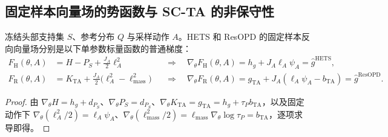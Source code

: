 \documentclass[lang=cn,scheme=chinese,openany]{elegantbook}
\begin{document}
\subsection{固定样本向量场的势函数与 SC-TA 的非保守性}

\begin{proposition}
\label{est:sample-potentials}
冻结头部支持集 $S$、参考分布 $Q$ 与采样动作 $A$。HETS 和 ResOPD 的固定样本反向向量场分别是以下单参数标量函数的普通梯度：
\begin{align}
F_{\mathrm H}(\theta,A)&=H-P_S+\frac{J_A}{2}\ell_A^2
&&\Longrightarrow\quad \nabla_\theta F_{\mathrm H}(\theta,A)=h_g+J_A\ell_A\psi_A=\widehat g^{\mathrm{HETS}},\\
F_{\mathrm R}(\theta,A)&=K_{\mathrm{TA}}+\frac{J_A}{2}\bigl(\ell_A^2-\ell_{\mathrm{mass}}^2\bigr)
&&\Longrightarrow\quad \nabla_\theta F_{\mathrm R}(\theta,A)=g_{\mathrm{TA}}+J_A(\ell_A\psi_A-b_{\mathrm{TA}})=\widehat g^{\mathrm{ResOPD}}.
\end{align}
\end{proposition}
\begin{proof}
由 $\nabla_\theta H=h_g+d_{P_S}$、$\nabla_\theta P_S=d_{P_S}$、$\nabla_\theta K_{\mathrm{TA}}=g_{\mathrm{TA}}=h_g+\tau_P b_{\mathrm{TA}}$，以及固定动作下 $\nabla_\theta(\ell_A^2/2)=\ell_A\psi_A$、$\nabla_\theta(\ell_{\mathrm{mass}}^2/2)=\ell_{\mathrm{mass}}\nabla_\theta\log\tau_P=b_{\mathrm{TA}}$，逐项求导即得。
\end{proof}
\end{document}
